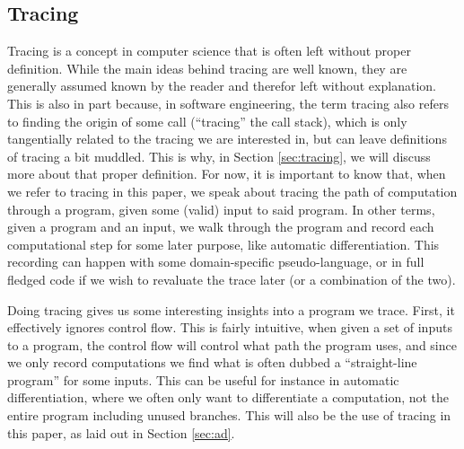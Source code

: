    \subsection{Tracing}
        Tracing is a concept in computer science that is often left without proper definition.
        While the main ideas behind tracing are well known, they are generally assumed known by the reader and therefor left without explanation.
        This is also in part because, in software engineering, the term tracing also refers to finding the origin of some call (``tracing'' the call stack), which is only tangentially related to the tracing we are interested in, but can leave definitions of tracing a bit muddled.
        This is why, in Section \ref{sec:tracing}, we will discuss more about that proper definition.
        For now, it is important to know that, when we refer to tracing in this paper, we speak about tracing the path of computation through a program, given some (valid) input to said program.
        In other terms, given a program and an input, we walk through the program and record each computational step for some later purpose, like automatic differentiation.
        This recording can happen with some domain-specific pseudo-language, or in full fledged code if we wish to revaluate the trace later (or a combination of the two).

        Doing tracing gives us some interesting insights into a program we trace.
        First, it effectively ignores control flow.
        This is fairly intuitive, when given a set of inputs to a program, the control flow will control what path the program uses, and since we only record computations we find what is often dubbed a ``straight-line program'' for some inputs.
        This can be useful for instance in automatic differentiation, where we often only want to differentiate a computation, not the entire program including unused branches.
        This will also be the use of tracing in this paper, as laid out in Section \ref{sec:ad}.

